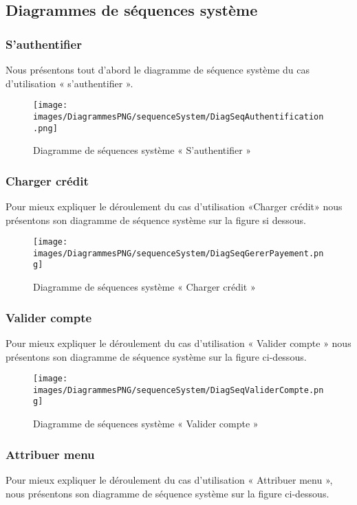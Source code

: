 {\subsection{Diagrammes de séquences système}
\subsubsection{S'authentifier}
Nous présentons tout d'abord le diagramme de séquence système du cas d'utilisation « s'authentifier ».

\begin{figure}[H]
\centering
\texttt{[image: images/DiagrammesPNG/sequenceSystem/DiagSeqAuthentification.png]}
\caption{Diagramme de séquences système « S'authentifier »}
\end{figure}

\newpage
\subsubsection{Charger crédit}
Pour mieux expliquer le déroulement du cas d'utilisation «Charger crédit» nous présentons son diagramme de séquence système sur la figure si dessous.

\begin{figure}[H]
\centering
\texttt{[image: images/DiagrammesPNG/sequenceSystem/DiagSeqGererPayement.png]}
\caption{Diagramme de séquences système « Charger crédit »}
\end{figure}

\newpage
\subsubsection{Valider compte}
Pour mieux expliquer le déroulement du cas d'utilisation « Valider compte » nous présentons son diagramme de séquence système sur la figure ci-dessous.

\begin{figure}[H]
\centering
\texttt{[image: images/DiagrammesPNG/sequenceSystem/DiagSeqValiderCompte.png]}
\caption{Diagramme de séquences système « Valider compte »}
\end{figure}

\newpage
\subsubsection{Attribuer menu}
Pour mieux expliquer le déroulement du cas d'utilisation « Attribuer menu »,  nous présentons son diagramme de séquence système sur la figure ci-dessous.

}
